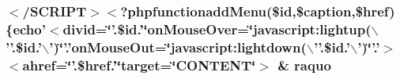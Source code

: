 \subsubsection{\setlength{\rightskip}{0pt plus 5cm}$<$/SCRIPT$>$$<$?phpfunctionadd\-Menu(\$id,\$caption,\$href)\{echo'$<$divid=\char`\"{}'.\$id.'\char`\"{}on\-Mouse\-Over=\char`\"{}javascript:lightup($\backslash$''.\$id.'$\backslash$')\char`\"{}'.'on\-Mouse\-Out=\char`\"{}javascript:lightdown($\backslash$''.\$id.'$\backslash$')\char`\"{}'.'$>$$<$ahref=\char`\"{}'.\$href.'\char`\"{}target=\char`\"{}CONTENT\char`\"{}$>$ \& raquo}\label{menu_8php_ccd684db6eec136c40fe3113f77bb639}


